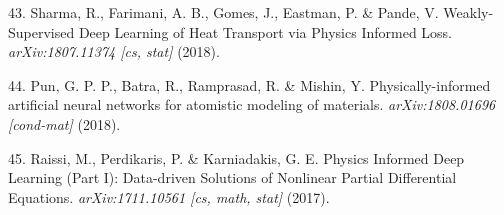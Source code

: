 \documentclass[12pt,a4paper,]{Dissertate}
\begin{document}
\leavevmode\hypertarget{ref-sharma_weakly-supervised_2018}{}%
43. Sharma, R., Farimani, A. B., Gomes, J., Eastman, P. \& Pande, V.
Weakly-Supervised Deep Learning of Heat Transport via Physics Informed
Loss. \emph{arXiv:1807.11374 {[}cs, stat{]}} (2018).

\leavevmode\hypertarget{ref-pun_physically-informed_2018}{}%
44. Pun, G. P. P., Batra, R., Ramprasad, R. \& Mishin, Y.
Physically-informed artificial neural networks for atomistic modeling of
materials. \emph{arXiv:1808.01696 {[}cond-mat{]}} (2018).

\leavevmode\hypertarget{ref-raissi_physics_2017-1}{}%
45. Raissi, M., Perdikaris, P. \& Karniadakis, G. E. Physics Informed
Deep Learning (Part I): Data-driven Solutions of Nonlinear Partial
Differential Equations. \emph{arXiv:1711.10561 {[}cs, math, stat{]}}
(2017).
\end{document}

